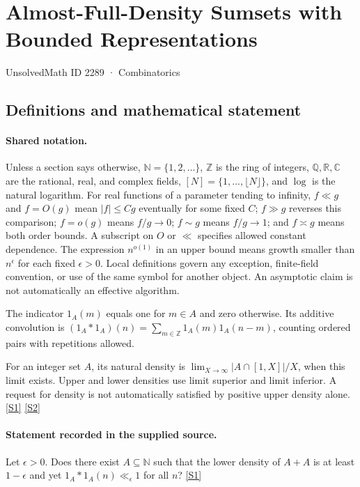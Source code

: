 \documentclass[11pt,a4paper]{article}
\newcommand{\N}{\mathbb{N}}
\newcommand{\Z}{\mathbb{Z}}
\newcommand{\Q}{\mathbb{Q}}
\newcommand{\R}{\mathbb{R}}
\newcommand{\C}{\mathbb{C}}
\newcommand{\sref}[2]{\hyperlink{source:#1:#2}{[S#2]}}
\begin{document}

\setcounter{section}{2288}

\section{Almost-Full-Density Sumsets with Bounded Representations}\label{2289}

{\small\sffamily UnsolvedMath ID 2289 · Combinatorics}

\subsection{Definitions and mathematical statement}

\paragraph{Shared notation.}Unless a section says otherwise, $\N=\{1,2,\ldots\}$,
$\Z$ is the ring of integers, $\Q,\R,\C$ are the rational, real, and complex
fields, $[N]=\{1,\ldots,\lfloor N\rfloor\}$, and $\log$ is the natural
logarithm. For real functions of a parameter tending to infinity,
$f\ll g$ and $f=O(g)$ mean $|f|\leq Cg$ eventually for some fixed $C$;
$f\gg g$ reverses this comparison; $f=o(g)$ means $f/g\to0$;
$f\sim g$ means $f/g\to1$; and $f\asymp g$ means both order bounds.
A subscript on $O$ or $\ll$ specifies allowed constant dependence.
The expression $n^{o(1)}$ in an upper bound means growth smaller than
$n^\epsilon$ for each fixed $\epsilon>0$. Local definitions govern any
exception, finite-field convention, or use of the same symbol for another
object. An asymptotic claim is not automatically an effective algorithm.



The indicator $1_A(m)$ equals one for $m\in A$ and zero otherwise. Its additive convolution is $(1_A*1_A)(n)=\sum_{m\in\Z}1_A(m)1_A(n-m)$, counting ordered pairs with repetitions allowed.

For an integer set $A$, its natural density is $\lim_{X\to\infty}|A\cap[1,X]|/X$, when this limit exists. Upper and lower densities use limit superior and limit inferior. A request for density is not automatically satisfied by positive upper density alone. \sref{2289}{1} \sref{2289}{2}

\paragraph{Statement recorded in the supplied source.}
Let $\epsilon>0$. Does there exist $A\subseteq \mathbb{N}$ such that the lower density of $A+A$ is at least $1-\epsilon$ and yet $1_A\ast 1_A(n) \ll_\epsilon 1$ for all $n$? \sref{2289}{1}
\end{document}
